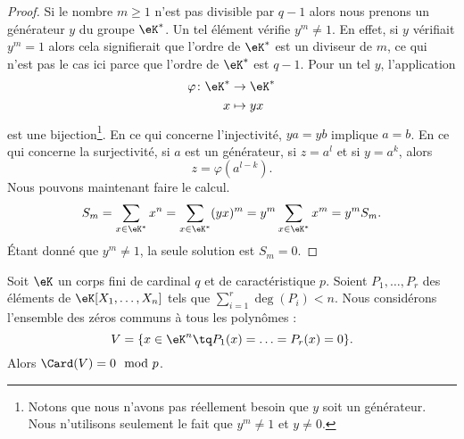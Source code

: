 \begin{proof}
    Si le nombre \( m\geq 1\) n'est pas divisible par \( q-1\) alors nous prenons un générateur \( y\) du groupe \( \eK^*\). Un tel élément vérifie \( y^m\neq 1\). En effet, si \( y\) vérifiait \( y^m=1\) alors cela signifierait que l'ordre de \( \eK^*\) est un diviseur de \( m\), ce qui n'est pas le cas ici parce que l'ordre de \( \eK^*\) est \( q-1\). Pour un tel \( y\), l'application
    \begin{equation}
        \begin{aligned}
            \varphi\colon \eK^*&\to \eK^* \\
            x&\mapsto yx 
        \end{aligned}
    \end{equation}
    est une bijection\footnote{Notons que nous n'avons pas réellement besoin que \( y\) soit un générateur. Nous n'utilisons seulement le fait que \( y^m\neq 1\) et \( y\neq 0\).}. En ce qui concerne l'injectivité, \( ya=yb\) implique \( a=b\). En ce qui concerne la surjectivité, si \( a\) est un générateur, si \( z=a^l\) et si \( y=a^k\), alors
    \begin{equation}
        z=\varphi(a^{l-k}).
    \end{equation}
    Nous pouvons maintenant faire le calcul.
    \begin{equation}
        S_m=\sum_{x\in \eK^*}x^n=\sum_{x\in \eK^*}(yx)^m=y^m\sum_{x\in \eK^*}x^m=y^mS_m.
    \end{equation}
    Étant donné que \( y^m\neq 1\), la seule solution est \( S_m=0\).
\end{proof}

\begin{theorem}        \label{ThoLTcYKk}
    Soit \( \eK\) un corps fini de cardinal \( q\) et de caractéristique \( p\). Soient \( P_1,\ldots, P_r\) des éléments de \( \eK[X_1,\ldots, X_n]\) tels que \( \sum_{i=1}^r\deg(P_i)<n\). Nous considérons l'ensemble des zéros communs à tous les polynômes :
    \begin{equation}
        V=\{ x\in \eK^n\tq P_1(x)=\ldots=P_r(x)=0 \}.
    \end{equation}
    Alors \( \Card(V)=0\mod p\).
\end{theorem}

